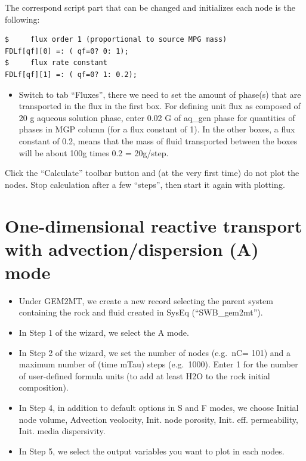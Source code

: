 \documentclass[
]{book}
\providecommand{\tightlist}{%
  \setlength{\itemsep}{0pt}\setlength{\parskip}{0pt}}
\begin{document}
The correspond script part that can be changed and initializes each node is the following:

\begin{verbatim}
$     flux order 1 (proportional to source MPG mass)
FDLf[qf][0] =: ( qf=0? 0: 1);
$     flux rate constant
FDLf[qf][1] =: ( qf=0? 1: 0.2);
\end{verbatim}

\begin{itemize}
\tightlist
\item
  Switch to tab ``Fluxes'', there we need to set the amount of phase(s) that are transported in the flux in the first box. For defining unit flux as composed of 20 g aqueous solution phase, enter 0.02 G of aq\_gen phase for quantities of phases in MGP column (for a flux constant of 1). In the other boxes, a flux constant of 0.2, means that the mass of fluid transported between the boxes will be about 100g times 0.2 = 20g/step.
\end{itemize}

Click the ``Calculate'' toolbar button and (at the very first time) do not plot the nodes. Stop calculation after a few ``steps'', then start it again with plotting.

\hypertarget{one-dimensional-reactive-transport-with-advectiondispersion-a-mode}{%
\section{One-dimensional reactive transport with advection/dispersion (A) mode}\label{one-dimensional-reactive-transport-with-advectiondispersion-a-mode}}

\begin{itemize}
\item
  Under GEM2MT, we create a new record selecting the parent system containing the rock and fluid created in SysEq (``SWB\_gem2mt'').
\item
  In Step 1 of the wizard, we select the A mode.
\item
  In Step 2 of the wizard, we set the number of nodes (e.g.~nC= 101) and a maximum number of (time mTau) steps (e.g.~1000). Enter 1 for the number of user-defined formula units (to add at least H2O to the rock initial composition).
\item
  In Step 4, in addition to default options in S and F modes, we choose Initial node volume, Advection veolocity, Init. node porosity, Init. eff. permeability, Init. media dispersivity.
\item
  In Step 5, we select the output variables you want to plot in each nodes.
\end{itemize}
\end{document}
